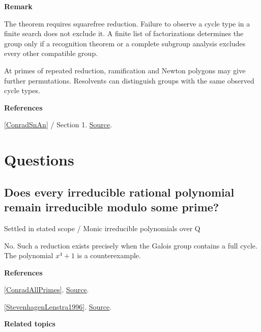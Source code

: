 \documentclass[11pt,a4paper,oneside,openany]{book}
\newenvironment{sources}{\par\smallskip\begingroup\footnotesize\color{atlasgray}\leftskip=10pt\setlength{\parskip}{2pt}}{\par\endgroup\smallskip}
\begin{document}
\begin{atlasblock}[boundary]
\textbf{\sffamily Remark}\par\smallskip
\color{black} The theorem requires squarefree reduction. Failure to observe a cycle type in a finite search does not exclude it. A finite list of factorizations determines the group only if a recognition theorem or a complete subgroup analysis excludes every other compatible group.\par
\end{atlasblock}\color{black}
\color{black} At primes of repeated reduction, ramification and Newton polygons may give further permutations. Resolvents can distinguish groups with the same observed cycle types.\par
\begin{sources}
\textbf{References}\par\smallskip
\noindent\hyperlink{ref:ConradSnAn}{[ConradSnAn]} / Section 1.  \href{https://kconrad.math.uconn.edu/blurbs/galoistheory/galoisSnAn.pdf}{Source}.\par
\end{sources}\color{black}
\section*{Questions}
\subsection*{Does every irreducible rational polynomial remain irreducible modulo some prime?}
{\small\sffamily\color{atlasgold}Settled in stated scope / Monic irreducible polynomials over Q}\par\smallskip
\color{black} No. Such a reduction exists precisely when the Galois group contains a full cycle. The polynomial \(x^4+1\) is a counterexample.\par
\begin{sources}
\textbf{References}\par\smallskip
\noindent\hyperlink{ref:ConradAllPrimes}{[ConradAllPrimes]}.  \href{https://kconrad.math.uconn.edu/blurbs/ringtheory/reducibleallp.pdf}{Source}.\par
\noindent\hyperlink{ref:StevenhagenLenstra1996}{[StevenhagenLenstra1996]}.  \href{https://pub.math.leidenuniv.nl/~lenstrahw/PUBLICATIONS/1996d/art.pdf}{Source}.\par
\end{sources}\color{black}
\par\medskip\begingroup\footnotesize\setlength{\parskip}{1pt}\textbf{\sffamily\color{atlasgreen}Related topics}\par
\end{document}
